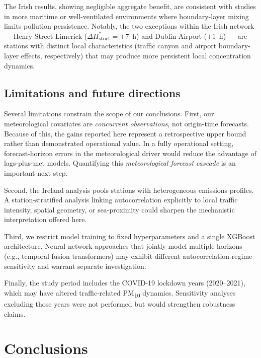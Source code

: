 \documentclass[12pt,a4paper]{article}
\newcommand{\PMten}{PM\textsubscript{10}}
\begin{document}
The Irish results, showing negligible aggregate benefit, are consistent with
studies in more maritime or well-ventilated environments where boundary-layer
mixing limits pollution persistence.  Notably, the
two exceptions within the Irish network — Henry Street Limerick
($\Delta H^*_{\text{strict}} = +7$~h) and Dublin Airport ($+1$~h) — are
stations with distinct local characteristics (traffic canyon and airport
boundary-layer effects, respectively) that may produce more persistent local
concentration dynamics.

\subsection{Limitations and future directions}

Several limitations constrain the scope of our conclusions.  First, our
meteorological covariates are \emph{concurrent observations}, not origin-time forecasts.
Because of this, the gains reported here represent a retrospective upper bound rather than
demonstrated operational value. In a fully operational setting, forecast-horizon errors
in the meteorological driver would reduce the advantage of lags-plus-met models.
Quantifying this \emph{meteorological forecast cascade} is an important next step.

Second, the Ireland analysis pools stations with heterogeneous emissions
profiles.  A station-stratified analysis linking autocorrelation explicitly to
local traffic intensity, spatial geometry, or sea-proximity could sharpen
the mechanistic interpretation offered here.

Third, we restrict model training to fixed hyperparameters and a single
XGBoost architecture.  Neural network approaches that jointly model multiple
horizons (e.g., temporal fusion transformers) may exhibit different
autocorrelation-regime sensitivity and warrant separate investigation.

Finally, the study period includes the COVID-19 lockdown years (2020--2021),
which may have altered traffic-related \PMten{} dynamics.  Sensitivity
analyses excluding those years were not performed but would strengthen
robustness claims.

\section{Conclusions}
\label{sec:conclusions}
\end{document}
